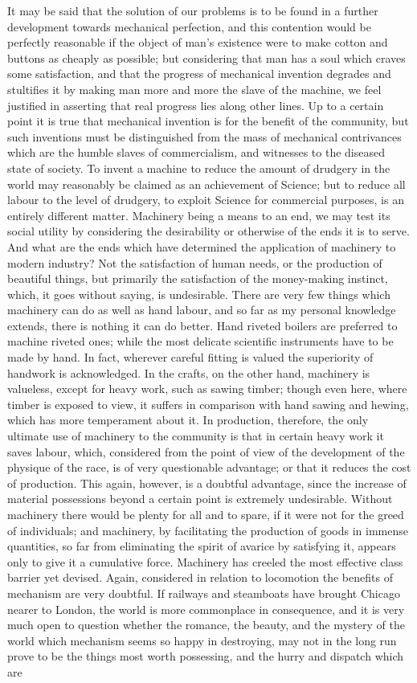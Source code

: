 \documentclass{book}
\begin{document}
It may be said that the solution of our problems is to be found in a further development towards mechanical perfection, and this contention would be perfectly reasonable if the object of man’s existence were to make cotton and buttons as cheaply as possible; but considering that man has a soul which craves some satisfaction, and that the progress of mechanical invention degrades and stultifies it by making man more and more the slave of the machine, we feel justified in asserting that real progress lies along other lines. Up to a certain point it is true that mechanical invention is for the benefit of the community, but such inventions must be distinguished from the mass of mechanical contrivances which are the humble slaves of commercialism, and witnesses to the diseased state of society. To invent a machine to reduce the amount of drudgery in the world may reasonably be claimed as an achievement of Science; but to reduce all labour to the level of drudgery, to exploit Science for commercial purposes, is an entirely different matter. Machinery being a means to an end, we may test its social utility by considering the desirability or otherwise of the ends it is to serve. And what are the ends which have determined the application of machinery to modern industry? Not the satisfaction of human needs, or the production of beautiful things, but primarily the satisfaction of the money-making instinct, which, it goes without saying, is undesirable. There are very few things which machinery can do as well as hand labour, and so far as my personal knowledge extends, there is nothing it can do better. Hand riveted boilers are preferred to machine riveted ones; while the most delicate scientific instruments have to be made by hand. In fact, wherever careful fitting is valued the superiority of handwork is acknowledged. In the crafts, on the other hand, machinery is valueless, except for heavy work, such as sawing timber; though even here, where timber is exposed to view, it suffers in comparison with hand sawing and hewing, which has more temperament about it. In production, therefore, the only ultimate use of machinery to the community is that in certain heavy work it saves labour, which, considered from the point of view of the development of the physique of the race, is of very questionable advantage; or that it reduces the cost of production. This again, however, is a doubtful advantage, since the increase of material possessions beyond a certain point is extremely undesirable. Without machinery there would be plenty for all and to spare, if it were not for the greed of individuals; and machinery, by facilitating the production of goods in immense quantities, so far from eliminating the spirit of avarice by satisfying it, appears only to give it a cumulative force. Machinery has creeled the most effective class barrier yet devised. Again, considered in relation to locomotion the benefits of mechanism are very doubtful. If railways and steamboats have brought Chicago nearer to London, the world is more commonplace in consequence, and it is very much open to question whether the romance, the beauty, and the mystery of the world which mechanism seems so happy in destroying, may not in the long run prove to be the things most worth possessing, and the hurry and dispatch which are 
\end{document}
